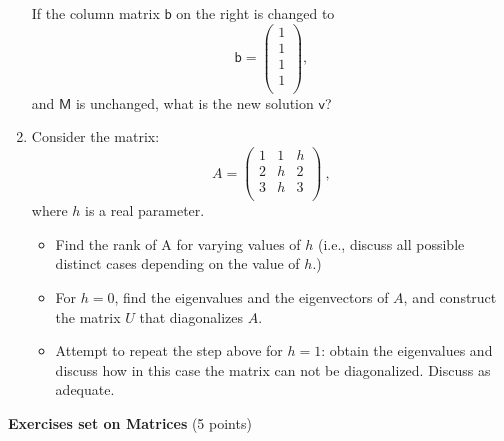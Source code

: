 \documentclass[fleqn]{article}
\begin{document}
\begin{enumerate}
  
    If the column matrix $\mathsf{b}$ on the right is changed to 
    \[
      \mathsf{b}
      =
      \left(
      \begin{array}{c}
          1 \\
          1 \\
          1 \\
          1 \\
      \end{array}
      \right),
    \]
    and $\mathsf{M}$ is unchanged, what is the new solution $\mathsf{v}$?
  
  
  \item Consider the matrix:
    $$
    A=\left(
    \begin{array}{ccc}
    1 & 1 & h \\
    2 & h & 2 \\
    3 & h & 3 \\
    \end{array}
    \right)~,
    $$
    where $h$ is a real parameter.  
    \begin{itemize}
    \item Find the rank of A for varying values of $h$ (i.e., discuss all possible distinct cases depending on the value of $h$.) 
  
    \item  For $h=0$, find the eigenvalues and the eigenvectors of $A$, and construct the matrix $U$ that diagonalizes $A$. 
  
    \item Attempt to repeat the step above for $h=1$: obtain the eigenvalues and discuss how in this case the matrix can not be diagonalized. Discuss as adequate. 
    \end{itemize}
  
  
  \end{enumerate}

\pagebreak


\textbf{Exercises set on Matrices} (5 points)
\end{document}
